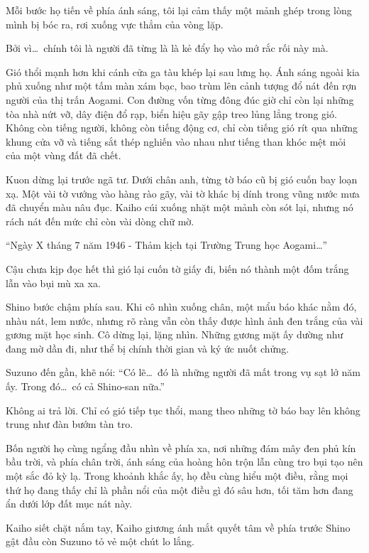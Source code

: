 \documentclass[../main.tex]{subfiles}
\begin{document}
Mỗi bước họ tiến về phía ánh sáng, tôi lại cảm thấy một mảnh ghép trong lòng mình bị bóc ra, rơi xuống vực thẳm của vòng lặp.

Bởi vì\dots\ chính tôi là người đã từng là là kẻ đẩy họ vào mớ rắc rối này mà.

\pov{-}

Gió thổi mạnh hơn khi cánh cửa ga tàu khép lại sau lưng họ. Ánh sáng ngoài kia phủ xuống như một tấm màn xám bạc, bao trùm lên cảnh tượng đổ nát đến rợn người của thị trấn Aogami. Con đường vốn từng đông đúc giờ chỉ còn lại những tòa nhà nứt vỡ, dây điện đổ rạp, biển hiệu gãy gập treo lủng lẳng trong gió. Không còn tiếng người, không còn tiếng động cơ, chỉ còn tiếng gió rít qua những khung cửa vỡ và tiếng sắt thép nghiến vào nhau như tiếng than khóc mệt mỏi của một vùng đất đã chết.

Kuon dừng lại trước ngã tư. Dưới chân anh, từng tờ báo cũ bị gió cuốn bay loạn xạ. Một vài tờ vướng vào hàng rào gãy, vài tờ khác bị dính trong vũng nước mưa đã chuyển màu nâu đục. Kaiho cúi xuống nhặt một mảnh còn sót lại, nhưng nó rách nát đến mức chỉ còn vài dòng chữ mờ.

``Ngày X tháng 7 năm 1946 - Thảm kịch tại Trường Trung học Aogami\dots''

Cậu chưa kịp đọc hết thì gió lại cuốn tờ giấy đi, biến nó thành một đốm trắng lẫn vào bụi mù xa xa.

Shino bước chậm phía sau. Khi cô nhìn xuống chân, một mẩu báo khác nằm đó, nhàu nát, lem nước, nhưng rõ ràng vẫn còn thấy được hình ảnh đen trắng của vài gương mặt học sinh. Cô dừng lại, lặng nhìn. Những gương mặt ấy dường như đang mờ dần đi, như thể bị chính thời gian và ký ức nuốt chửng.

Suzuno đến gần, khẽ nói: ``Có lẽ\dots\ đó là những người đã mất trong vụ sạt lở năm ấy. Trong đó\dots\ có cả Shino-san nữa.''

Không ai trả lời. Chỉ có gió tiếp tục thổi, mang theo những tờ báo bay lên không trung như đàn bướm tàn tro.

Bốn người họ cùng ngẩng đầu nhìn về phía xa, nơi những đám mây đen phủ kín bầu trời, và phía chân trời, ánh sáng của hoàng hôn trộn lẫn cùng tro bụi tạo nên một sắc đỏ kỳ lạ. Trong khoảnh khắc ấy, họ đều cùng hiểu một điều, rằng mọi thứ họ đang thấy chỉ là phần nổi của một điều gì đó sâu hơn, tối tăm hơn đang ẩn dưới lớp đất mục nát này.

Kaiho siết chặt nắm tay, Kaiho giương ánh mắt quyết tâm về phía trước Shino gật đầu còn Suzuno tỏ vẻ một chút lo lắng.
\end{document}
